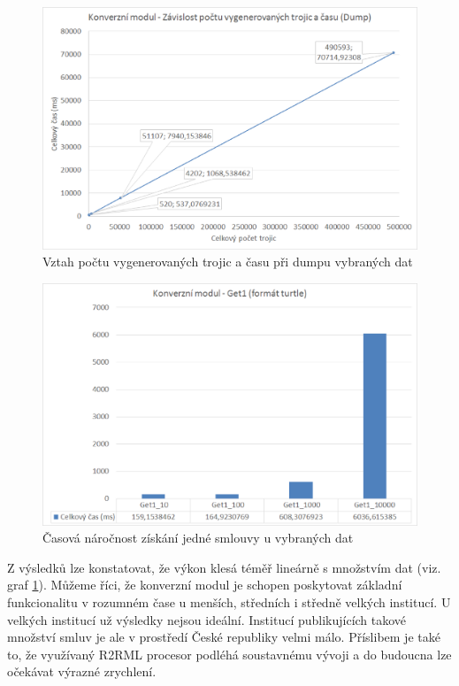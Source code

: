 \begin{figure}[H]
\centerline{\includegraphics[width=\textwidth]{img/graphDump2.eps}}
\caption{Vztah počtu vygenerovaných trojic a času při dumpu vybraných dat}
\label{obr:graphDump2}
\end{figure}

\begin{figure}[H]
\centerline{\includegraphics[width=\textwidth]{img/graphGet1.eps}}
\caption{Časová náročnost získání jedné smlouvy u vybraných dat}
\label{obr:graphGet1}
\end{figure}

\newpage
Z výsledků lze konstatovat, že výkon klesá téměř lineárně s množstvím dat (viz. graf \ref{obr:graphDump2}). Můžeme říci, že konverzní modul je schopen poskytovat základní funkcionalitu v rozumném čase u menších, středních i středně velkých institucí. U velkých institucí už výsledky nejsou ideální. Institucí publikujících takové množství smluv je ale v prostředí České republiky velmi málo. Příslibem je také to, že využívaný R2RML procesor podléhá soustavnému vývoji a do budoucna lze očekávat výrazné zrychlení.

